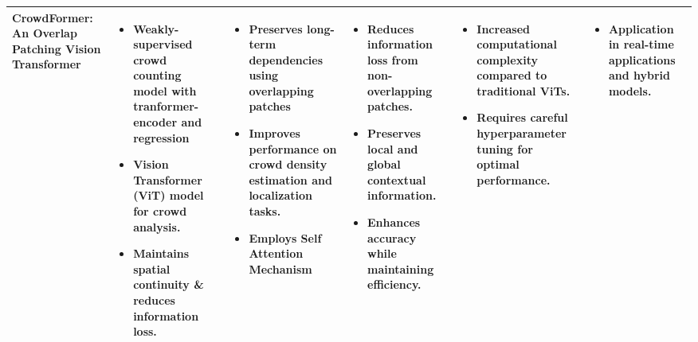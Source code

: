 \documentclass{article}
\begin{document}
\begin{adjustbox}{width=\textwidth}
\begin{tabular} {|p{}|p{}|p{}|p{}|p{}|p{}|}
    \hline
    \vspace{0.1in}
  \large \textbf{ CrowdFormer: An Overlap Patching Vision Transformer} & 
    \begin{itemize}[leftmargin=*]
        \item Weakly-supervised crowd counting model with tranformer-encoder and regression
        \item Vision Transformer (ViT) model for crowd analysis. 
        \item Maintains spatial continuity \& reduces information loss.
    \end{itemize} & 
    \begin{itemize}[leftmargin=*]
         \item Preserves long-term dependencies using overlapping patches
         \item Improves performance on crowd density estimation and localization tasks.
         \item Employs Self Attention Mechanism
    \end{itemize} & 
    \begin{itemize}[leftmargin=*]
        \item Reduces information loss from non-overlapping patches.
        \item Preserves local and global contextual information.
        \item Enhances accuracy while maintaining efficiency.
    \end{itemize} & 
    \begin{itemize}[leftmargin=*]
        \item Increased computational complexity compared to traditional ViTs.
        \item Requires careful hyperparameter tuning for optimal performance.
    \end{itemize} & 
     \begin{itemize}[leftmargin=*]
        \item Application in real-time applications and hybrid models.  
    \end{itemize} 
    \\
    \hline
\end{tabular}
\newpage


\end{adjustbox}
\end{document}

